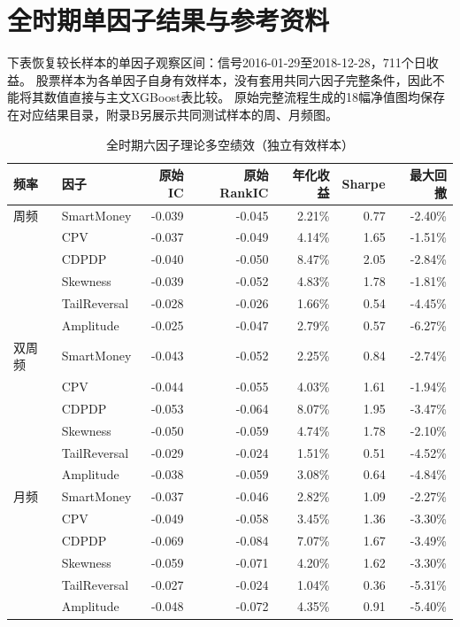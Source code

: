 \documentclass[UTF8,zihao=-4,fontset=fandol]{ctexart}
\begin{document}
\clearpage
\appendix
\section{全时期单因子结果与参考资料}
下表恢复较长样本的单因子观察区间：信号2016-01-29至2018-12-28，711个日收益。
股票样本为各单因子自身有效样本，没有套用共同六因子完整条件，因此不能将其数值直接与主文XGBoost表比较。
原始完整流程生成的18幅净值图均保存在对应结果目录，附录B另展示共同测试样本的周、月频图。
\begin{table}[H]\centering\small
\caption{全时期六因子理论多空绩效（独立有效样本）}
\begin{tabular}{llrrrrr}\toprule
频率 & 因子 & 原始IC & 原始RankIC & 年化收益 & Sharpe & 最大回撤\\\midrule
周频 & SmartMoney & -0.039 & -0.045 & 2.21\% & 0.77 & -2.40\% \\
 & CPV & -0.037 & -0.049 & 4.14\% & 1.65 & -1.51\% \\
 & CDPDP & -0.040 & -0.050 & 8.47\% & 2.05 & -2.84\% \\
 & Skewness & -0.039 & -0.052 & 4.83\% & 1.78 & -1.81\% \\
 & TailReversal & -0.028 & -0.026 & 1.66\% & 0.54 & -4.45\% \\
 & Amplitude & -0.025 & -0.047 & 2.79\% & 0.57 & -6.27\% \\
\midrule
双周频 & SmartMoney & -0.043 & -0.052 & 2.25\% & 0.84 & -2.74\% \\
 & CPV & -0.044 & -0.055 & 4.03\% & 1.61 & -1.94\% \\
 & CDPDP & -0.053 & -0.064 & 8.07\% & 1.95 & -3.47\% \\
 & Skewness & -0.050 & -0.059 & 4.74\% & 1.78 & -2.10\% \\
 & TailReversal & -0.029 & -0.024 & 1.51\% & 0.51 & -4.52\% \\
 & Amplitude & -0.038 & -0.059 & 3.08\% & 0.64 & -4.84\% \\
\midrule
月频 & SmartMoney & -0.037 & -0.046 & 2.82\% & 1.09 & -2.27\% \\
 & CPV & -0.049 & -0.058 & 3.45\% & 1.36 & -3.30\% \\
 & CDPDP & -0.069 & -0.084 & 7.07\% & 1.67 & -3.49\% \\
 & Skewness & -0.059 & -0.071 & 4.20\% & 1.62 & -3.30\% \\
 & TailReversal & -0.027 & -0.024 & 1.04\% & 0.36 & -5.31\% \\
 & Amplitude & -0.048 & -0.072 & 4.35\% & 0.91 & -5.40\% \\
\midrule
\bottomrule
\end{tabular}\end{table}
\end{document}
